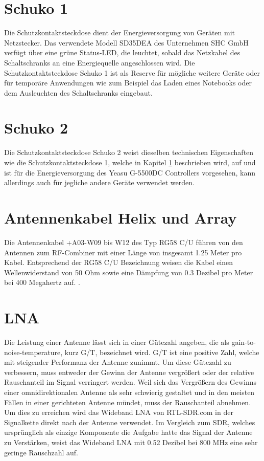 \section{Schuko 1}
\label{sec:schuko1}
Die Schutzkontaktsteckdose dient der Energieversorgung von Geräten mit Netzstecker. Das verwendete Modell SD35DEA des Unternehmen SHC GmbH verfügt über eine grüne Status-LED, die leuchtet, sobald das Netzkabel des Schaltschranks an eine Energiequelle angeschlossen wird. Die Schutzkontaktsteckdose Schuko 1 ist als Reserve für mögliche weitere Geräte oder für temporäre Anwendungen wie zum Beispiel das Laden eines Notebooks oder dem Ausleuchten des Schaltschranks eingebaut.

\section{Schuko 2}
\label{sec:schuko2}
Die Schutzkontaktsteckdose Schuko 2 weist dieselben technischen Eigenschaften wie die Schutzkontaktsteckdose 1, welche in Kapitel \ref{sec:schuko1} beschrieben wird, auf und ist für die Energieversorgung des Yeasu G-5500DC Controllers vorgesehen, kann allerdings auch für jegliche andere Geräte verwendet werden.

\section{Antennenkabel Helix und Array}
\label{sec:Antennenkabel-Helix}
Die Antennenkabel +A03-W09 bis W12 des Typ RG58 C/U führen von den Antennen zum RF-Combiner mit einer Länge von insgesamt 1.25 Meter pro Kabel. Entsprechend der RG58 C/U Bezeichnung weisen die Kabel einen Wellenwiderstand von 50 Ohm \cite{noauthor_rg_nodate} sowie eine Dämpfung von 0.3 Dezibel pro Meter bei 400 Megahertz auf. \cite{noauthor_vergleich_nodate}. 

\section{LNA}
\label{sec:LNA}
Die Leistung einer Antenne lässt sich in einer Gütezahl angeben, die als gain-to-noise-temperature, kurz G/T, bezeichnet wird. G/T ist eine positive Zahl, welche mit steigender Performanz der Antenne zunimmt. Um diese Gütezahl zu verbessern, muss entweder der Gewinn der Antenne vergrößert oder der relative Rauschanteil im Signal verringert werden. Weil sich das Vergrößern des Gewinns einer omnidirektionalen Antenne als sehr schwierig gestaltet und in den meisten Fällen in einer gerichteten Antenne mündet, muss der Rauschanteil abnehmen. Um dies zu erreichen wird das Wideband LNA von RTL-SDR.com in der Signalkette direkt nach der Antenne verwendet. Im Vergleich zum SDR, welches ursprünglich als einzige Komponente die Aufgabe hatte das Signal der Antenne zu Verstärken, weist das Wideband LNA mit 0.52 Dezibel bei 800 MHz eine sehr geringe Rauschzahl auf. \cite{noauthor_new_nodate} \cite{noauthor_omnidirectional_nodate}

